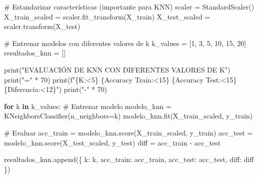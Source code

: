 \documentclass[
  doc,
  floatsintext,
  longtable,
  a4paper,
  nolmodern,
  notxfonts,
  notimes,
  12pt,
  colorlinks=true,linkcolor=blue,citecolor=blue,urlcolor=blue]{apa7}
\newenvironment{Shaded}{\begin{snugshade}}{\end{snugshade}}
\newcommand{\BuiltInTok}[1]{\textcolor[rgb]{0.00,0.23,0.31}{#1}}
\newcommand{\CommentTok}[1]{\textcolor[rgb]{0.37,0.37,0.37}{#1}}
\newcommand{\ControlFlowTok}[1]{\textcolor[rgb]{0.00,0.23,0.31}{\textbf{#1}}}
\newcommand{\DecValTok}[1]{\textcolor[rgb]{0.68,0.00,0.00}{#1}}
\newcommand{\KeywordTok}[1]{\textcolor[rgb]{0.00,0.23,0.31}{\textbf{#1}}}
\newcommand{\NormalTok}[1]{\textcolor[rgb]{0.00,0.23,0.31}{#1}}
\newcommand{\OperatorTok}[1]{\textcolor[rgb]{0.37,0.37,0.37}{#1}}
\newcommand{\SpecialCharTok}[1]{\textcolor[rgb]{0.37,0.37,0.37}{#1}}
\newcommand{\SpecialStringTok}[1]{\textcolor[rgb]{0.13,0.47,0.30}{#1}}
\newcommand{\StringTok}[1]{\textcolor[rgb]{0.13,0.47,0.30}{#1}}
\begin{document}
\begin{Shaded}
\begin{Highlighting}[]
\CommentTok{\# Estandarizar características (importante para KNN)}
\NormalTok{scaler }\OperatorTok{=}\NormalTok{ StandardScaler()}
\NormalTok{X\_train\_scaled }\OperatorTok{=}\NormalTok{ scaler.fit\_transform(X\_train)}
\NormalTok{X\_test\_scaled }\OperatorTok{=}\NormalTok{ scaler.transform(X\_test)}

\CommentTok{\# Entrenar modelos con diferentes valores de k}
\NormalTok{k\_values }\OperatorTok{=}\NormalTok{ [}\DecValTok{1}\NormalTok{, }\DecValTok{3}\NormalTok{, }\DecValTok{5}\NormalTok{, }\DecValTok{10}\NormalTok{, }\DecValTok{15}\NormalTok{, }\DecValTok{20}\NormalTok{]}
\NormalTok{resultados\_knn }\OperatorTok{=}\NormalTok{ []}

\BuiltInTok{print}\NormalTok{(}\StringTok{"EVALUACIÓN DE KNN CON DIFERENTES VALORES DE K"}\NormalTok{)}
\BuiltInTok{print}\NormalTok{(}\StringTok{"="} \OperatorTok{*} \DecValTok{70}\NormalTok{)}
\BuiltInTok{print}\NormalTok{(}\SpecialStringTok{f"}\SpecialCharTok{\{}\StringTok{\textquotesingle{}K\textquotesingle{}}\SpecialCharTok{:\textless{}5\}}\SpecialStringTok{ }\SpecialCharTok{\{}\StringTok{\textquotesingle{}Accuracy Train\textquotesingle{}}\SpecialCharTok{:\textless{}15\}}\SpecialStringTok{ }\SpecialCharTok{\{}\StringTok{\textquotesingle{}Accuracy Test\textquotesingle{}}\SpecialCharTok{:\textless{}15\}}\SpecialStringTok{ }\SpecialCharTok{\{}\StringTok{\textquotesingle{}Diferencia\textquotesingle{}}\SpecialCharTok{:\textless{}12\}}\SpecialStringTok{"}\NormalTok{)}
\BuiltInTok{print}\NormalTok{(}\StringTok{"{-}"} \OperatorTok{*} \DecValTok{70}\NormalTok{)}

\ControlFlowTok{for}\NormalTok{ k }\KeywordTok{in}\NormalTok{ k\_values:}
    \CommentTok{\# Entrenar modelo}
\NormalTok{    modelo\_knn }\OperatorTok{=}\NormalTok{ KNeighborsClassifier(n\_neighbors}\OperatorTok{=}\NormalTok{k)}
\NormalTok{    modelo\_knn.fit(X\_train\_scaled, y\_train)}
    
    \CommentTok{\# Evaluar}
\NormalTok{    acc\_train }\OperatorTok{=}\NormalTok{ modelo\_knn.score(X\_train\_scaled, y\_train)}
\NormalTok{    acc\_test }\OperatorTok{=}\NormalTok{ modelo\_knn.score(X\_test\_scaled, y\_test)}
\NormalTok{    diff }\OperatorTok{=}\NormalTok{ acc\_train }\OperatorTok{{-}}\NormalTok{ acc\_test}
    
\NormalTok{    resultados\_knn.append(\{}
        \StringTok{\textquotesingle{}k\textquotesingle{}}\NormalTok{: k,}
        \StringTok{\textquotesingle{}acc\_train\textquotesingle{}}\NormalTok{: acc\_train,}
        \StringTok{\textquotesingle{}acc\_test\textquotesingle{}}\NormalTok{: acc\_test,}
        \StringTok{\textquotesingle{}diff\textquotesingle{}}\NormalTok{: diff}
\NormalTok{    \})}
    

\end{Highlighting}
\end{Shaded}
\end{document}

